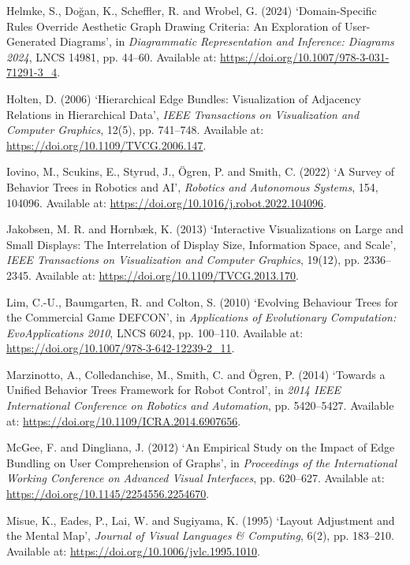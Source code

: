 \documentclass[11pt,a4paper,oneside,extrafontsizes]{memoir}
\begin{document}
Helmke, S., Doğan, K., Scheffler, R. and Wrobel, G. (2024) ‘Domain-Specific Rules Override Aesthetic Graph Drawing Criteria: An Exploration of User-Generated Diagrams’, in \emph{Diagrammatic Representation and Inference: Diagrams 2024}, LNCS 14981, pp. 44–60. Available at: \href{https://doi.org/10.1007/978-3-031-71291-3\_4}{https://doi.org/10.1007/978-3-031-71291-3\_4}.

Holten, D. (2006) ‘Hierarchical Edge Bundles: Visualization of Adjacency Relations in Hierarchical Data’, \emph{IEEE Transactions on Visualization and Computer Graphics}, 12(5), pp. 741–748. Available at: \href{https://doi.org/10.1109/TVCG.2006.147}{https://doi.org/10.1109/TVCG.2006.147}.

Iovino, M., Scukins, E., Styrud, J., Ögren, P. and Smith, C. (2022) ‘A Survey of Behavior Trees in Robotics and AI’, \emph{Robotics and Autonomous Systems}, 154, 104096. Available at: \href{https://doi.org/10.1016/j.robot.2022.104096}{https://doi.org/10.1016/j.robot.2022.104096}.

Jakobsen, M. R. and Hornbæk, K. (2013) ‘Interactive Visualizations on Large and Small Displays: The Interrelation of Display Size, Information Space, and Scale’, \emph{IEEE Transactions on Visualization and Computer Graphics}, 19(12), pp. 2336–2345. Available at: \href{https://doi.org/10.1109/TVCG.2013.170}{https://doi.org/10.1109/TVCG.2013.170}.

Lim, C.-U., Baumgarten, R. and Colton, S. (2010) ‘Evolving Behaviour Trees for the Commercial Game DEFCON’, in \emph{Applications of Evolutionary Computation: EvoApplications 2010}, LNCS 6024, pp. 100–110. Available at: \href{https://doi.org/10.1007/978-3-642-12239-2\_11}{https://doi.org/10.1007/978-3-642-12239-2\_11}.

Marzinotto, A., Colledanchise, M., Smith, C. and Ögren, P. (2014) ‘Towards a Unified Behavior Trees Framework for Robot Control’, in \emph{2014 IEEE International Conference on Robotics and Automation}, pp. 5420–5427. Available at: \href{https://doi.org/10.1109/ICRA.2014.6907656}{https://doi.org/10.1109/ICRA.2014.6907656}.

McGee, F. and Dingliana, J. (2012) ‘An Empirical Study on the Impact of Edge Bundling on User Comprehension of Graphs’, in \emph{Proceedings of the International Working Conference on Advanced Visual Interfaces}, pp. 620–627. Available at: \href{https://doi.org/10.1145/2254556.2254670}{https://doi.org/10.1145/2254556.2254670}.

Misue, K., Eades, P., Lai, W. and Sugiyama, K. (1995) ‘Layout Adjustment and the Mental Map’, \emph{Journal of Visual Languages \& Computing}, 6(2), pp. 183–210. Available at: \href{https://doi.org/10.1006/jvlc.1995.1010}{https://doi.org/10.1006/jvlc.1995.1010}.
\end{document}
